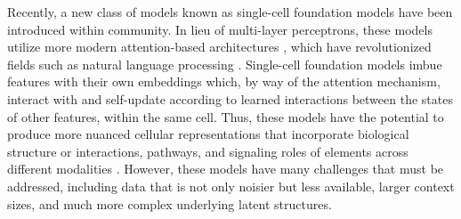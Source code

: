 Recently, a new class of models known as single-cell foundation models have been introduced within community.
In lieu of multi-layer perceptrons, these models \cite{theodoris2023, cui2024, rosen2023} utilize more modern attention-based architectures \cite{vaswani2023}, which have revolutionized fields such as natural language processing \cite{devlin2019, openai2024}.
Single-cell foundation models imbue features with their own embeddings which, by way of the attention mechanism, interact with and self-update according to learned interactions between the states of other features, within the same cell.
Thus, these models have the potential to produce more nuanced cellular representations that incorporate biological structure \cite{stark2021,roohani2023}
or interactions, pathways, and signaling roles of elements across different modalities \cite{argelaguet2018, immer2024,}.
However, these models have many challenges \cite{ma2024, kedzierska2023, crowell2023} that must be addressed, including  data that is not only noisier but less available, larger context sizes, and much more complex underlying latent structures.

  

